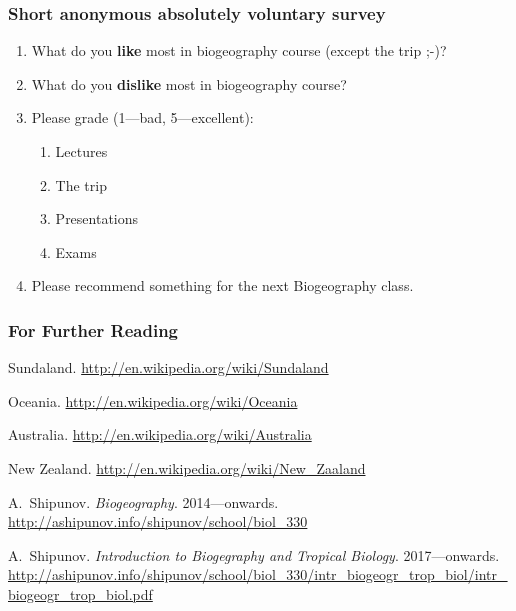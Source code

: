 \documentclass{beamer}
\begin{document}

\begin{frame}
\frametitle{Short anonymous absolutely voluntary survey}

\begin{enumerate}

\item What do you \textbf{like} most in biogeography course (except the trip ;-)?

\item What do you \textbf{dislike} most in biogeography course?

\item Please grade (1---bad, 5---excellent):

\begin{enumerate}

\item Lectures

\item The trip

\item Presentations

\item Exams

\end{enumerate}

\item Please recommend something for the next Biogeography class.

\end{enumerate}
\end{frame}


\begin{frame}
\frametitle{For Further Reading}

\begin{thebibliography}{10}
\beamertemplatearticlebibitems\scriptsize

 Sundaland. \newblock \url{http://en.wikipedia.org/wiki/Sundaland}

 Oceania. \newblock \url{http://en.wikipedia.org/wiki/Oceania}

 Australia. \newblock \url{http://en.wikipedia.org/wiki/Australia}

 New Zealand. \newblock \url{http://en.wikipedia.org/wiki/New_Zaaland}

 A.~Shipunov. {\em Biogeography}. 2014---onwards. \newblock \url{http://ashipunov.info/shipunov/school/biol_330}

 A.~Shipunov. {\em Introduction to Biogegraphy and Tropical Biology}. 2017---onwards. \newblock \url{http://ashipunov.info/shipunov/school/biol_330/intr_biogeogr_trop_biol/intr_biogeogr_trop_biol.pdf}

\end{thebibliography}

\end{frame}
\end{document}
